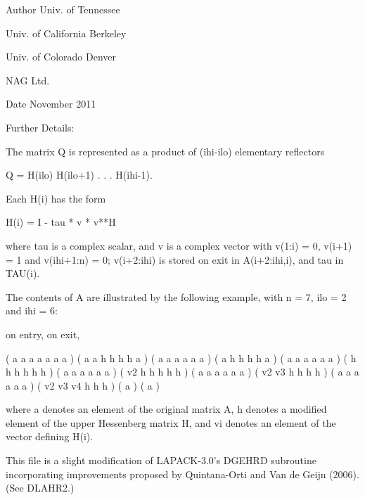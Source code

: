 \begin{DoxyAuthor}{Author}
Univ. of Tennessee 

Univ. of California Berkeley 

Univ. of Colorado Denver 

N\+A\+G Ltd. 
\end{DoxyAuthor}
\begin{DoxyDate}{Date}
November 2011 
\end{DoxyDate}
\begin{DoxyParagraph}{Further Details\+: }
\begin{DoxyVerb}  The matrix Q is represented as a product of (ihi-ilo) elementary
  reflectors

     Q = H(ilo) H(ilo+1) . . . H(ihi-1).

  Each H(i) has the form

     H(i) = I - tau * v * v**H

  where tau is a complex scalar, and v is a complex vector with
  v(1:i) = 0, v(i+1) = 1 and v(ihi+1:n) = 0; v(i+2:ihi) is stored on
  exit in A(i+2:ihi,i), and tau in TAU(i).

  The contents of A are illustrated by the following example, with
  n = 7, ilo = 2 and ihi = 6:

  on entry,                        on exit,

  ( a   a   a   a   a   a   a )    (  a   a   h   h   h   h   a )
  (     a   a   a   a   a   a )    (      a   h   h   h   h   a )
  (     a   a   a   a   a   a )    (      h   h   h   h   h   h )
  (     a   a   a   a   a   a )    (      v2  h   h   h   h   h )
  (     a   a   a   a   a   a )    (      v2  v3  h   h   h   h )
  (     a   a   a   a   a   a )    (      v2  v3  v4  h   h   h )
  (                         a )    (                          a )

  where a denotes an element of the original matrix A, h denotes a
  modified element of the upper Hessenberg matrix H, and vi denotes an
  element of the vector defining H(i).

  This file is a slight modification of LAPACK-3.0's DGEHRD
  subroutine incorporating improvements proposed by Quintana-Orti and
  Van de Geijn (2006). (See DLAHR2.)\end{DoxyVerb}
 
\end{DoxyParagraph}
\hypertarget{group__complex16GEcomputational_ga3ef30af067557006a607c01cc2310955}{}

